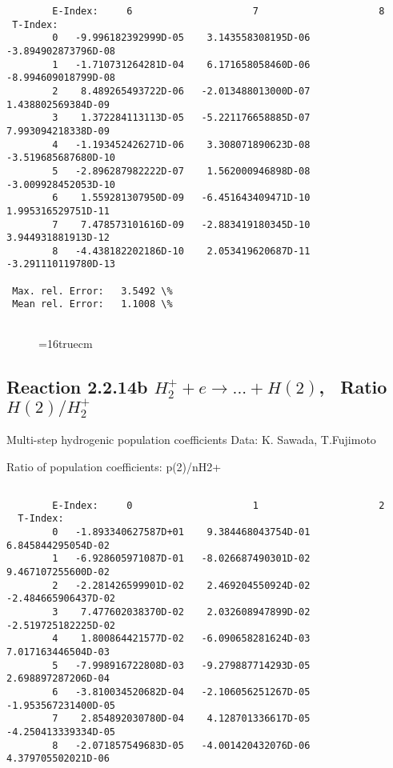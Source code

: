 \documentclass[12pt,dvipdfmx]{article}
\begin{document}
{\begin{small}
\begin{verbatim}
        E-Index:     6                     7                     8
 T-Index:
        0   -9.996182392999D-05    3.143558308195D-06   -3.894902873796D-08
        1   -1.710731264281D-04    6.171658058460D-06   -8.994609018799D-08
        2    8.489265493722D-06   -2.013488013000D-07    1.438802569384D-09
        3    1.372284113113D-05   -5.221176658885D-07    7.993094218338D-09
        4   -1.193452426271D-06    3.308071890623D-08   -3.519685687680D-10
        5   -2.896287982222D-07    1.562000946898D-08   -3.009928452053D-10
        6    1.559281307950D-09   -6.451643409471D-10    1.995316529751D-11
        7    7.478573101616D-09   -2.883419180345D-10    3.944931881913D-12
        8   -4.438182202186D-10    2.053419620687D-11   -3.291110119780D-13

 Max. rel. Error:   3.5492 \%
 Mean rel. Error:   1.1008 \%


\end{verbatim}\end{small}
\begin{figure} \label{2.2.14a}
\epsfxsize=16truecm
\end{figure}
\newpage

\subsection{
Reaction 2.2.14b $ H_2^+ + e \rightarrow ...+ H(2) $, \  Ratio $H(2)/H_2^+  $
}

 Multi-step hydrogenic population coefficients
 Data: K. Sawada, T.Fujimoto \cite{kn:Sawada}

 Ratio of population coefficients: p(2)/nH2+

\begin{small}\begin{verbatim}

        E-Index:     0                     1                     2
  T-Index:
        0   -1.893340627587D+01    9.384468043754D-01    6.845844295054D-02
        1   -6.928605971087D-01   -8.026687490301D-02    9.467107255600D-02
        2   -2.281426599901D-02    2.469204550924D-02   -2.484665906437D-02
        3    7.477602038370D-02    2.032608947899D-02   -2.519725182225D-02
        4    1.800864421577D-02   -6.090658281624D-03    7.017163446504D-03
        5   -7.998916722808D-03   -9.279887714293D-05    2.698897287206D-04
        6   -3.810034520682D-04   -2.106056251267D-05   -1.953567231400D-05
        7    2.854892030780D-04    4.128701336617D-05   -4.250413339334D-05
        8   -2.071857549683D-05   -4.001420432076D-06    4.379705502021D-06


\end{verbatim}
\end{small}}
\end{document}
